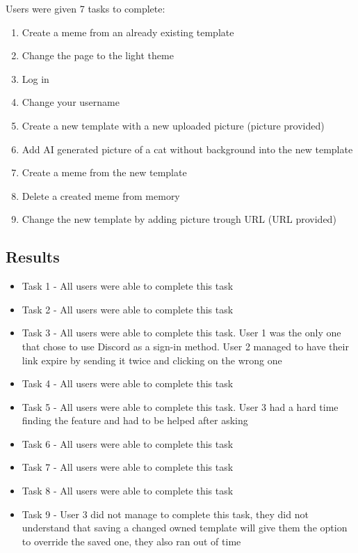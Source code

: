 Users were given 7 tasks to complete:
\begin{enumerate}
    \item Create a meme from an already existing template
    \item Change the page to the light theme
    \item Log in
    \item Change your username
    \item Create a new template with a new uploaded picture (picture provided)
    \item Add AI generated picture of a cat without background into the new template
    \item Create a meme from the new template
    \item Delete a created meme from memory
    \item Change the new template by adding picture trough URL  (URL provided)
\end{enumerate}

\subsection{Results}
\begin{itemize}
\item Task 1 - All users were able to complete this task
\item Task 2 - All users were able to complete this task
\item Task 3 - All users were able to complete this task. User 1 was the only one that chose to use Discord as a sign-in method. User 2 managed to have their link expire by sending it twice and clicking on the wrong one
\item Task 4 - All users were able to complete this task
\item Task 5 - All users were able to complete this task. User 3 had a hard time finding the feature and had to be helped after asking
\item Task 6 - All users were able to complete this task
\item Task 7 - All users were able to complete this task
\item Task 8 - All users were able to complete this task
\item Task 9 - User 3 did not manage to complete this task, they did not understand that saving a changed owned template will give them the option to override the saved one, they also ran out of time
\end{itemize}

